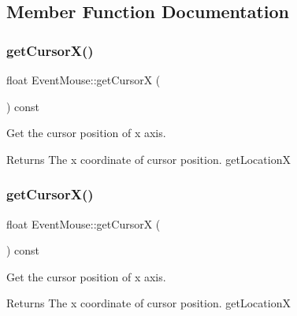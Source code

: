 \subsection{Member Function Documentation}
\mbox{\label{classEventMouse_a27e8c8d55e83a9ddbdd7bffcf7c865b5}} 
\subsubsection{\texorpdfstring{get\+Cursor\+X()}{getCursorX()}\hspace{0.1cm}{\footnotesize\ttfamily [1/2]}}
{\footnotesize\ttfamily float Event\+Mouse\+::get\+CursorX (\begin{DoxyParamCaption}{ }\end{DoxyParamCaption}) const\hspace{0.3cm}{\ttfamily [inline]}}

Get the cursor position of x axis.

\begin{DoxyReturn}{Returns}
The x coordinate of cursor position.  get\+LocationX 
\end{DoxyReturn}
\mbox{\label{classEventMouse_a27e8c8d55e83a9ddbdd7bffcf7c865b5}} 
\subsubsection{\texorpdfstring{get\+Cursor\+X()}{getCursorX()}\hspace{0.1cm}{\footnotesize\ttfamily [2/2]}}
{\footnotesize\ttfamily float Event\+Mouse\+::get\+CursorX (\begin{DoxyParamCaption}{ }\end{DoxyParamCaption}) const\hspace{0.3cm}{\ttfamily [inline]}}

Get the cursor position of x axis.

\begin{DoxyReturn}{Returns}
The x coordinate of cursor position.  get\+LocationX 
\end{DoxyReturn}
\mbox{\label{classEventMouse_af63042e92d51480cdc990360eb4e1166}} 
